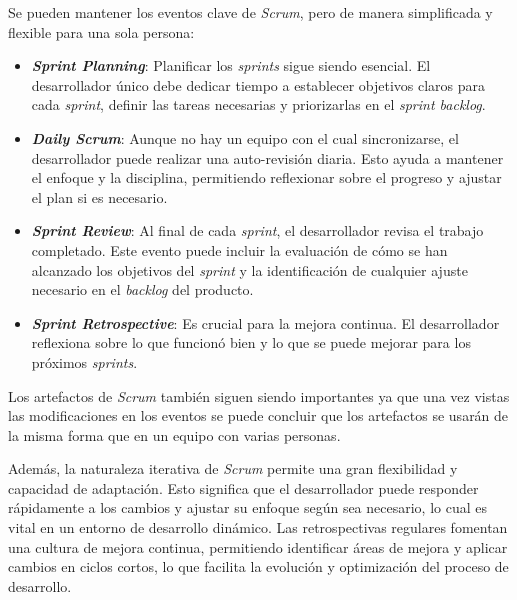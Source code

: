 Se pueden mantener los eventos clave de \textit{Scrum}, pero de manera simplificada y flexible para una sola persona:
\begin{itemize}
    
    \item\textbf{\textit{Sprint Planning}}: Planificar los \textit{sprints} sigue siendo esencial. El desarrollador único debe dedicar tiempo a establecer objetivos claros para cada \textit{sprint}, definir las tareas necesarias y priorizarlas en el \textit{sprint backlog}.
    
    \item\textbf{\textit{Daily Scrum}}: Aunque no hay un equipo con el cual sincronizarse, el desarrollador puede realizar una auto-revisión diaria. Esto ayuda a mantener el enfoque y la disciplina, permitiendo reflexionar sobre el progreso y ajustar el plan si es necesario.
    
    \item\textbf{\textit{Sprint Review}}: Al final de cada \textit{sprint}, el desarrollador revisa el trabajo completado. Este evento puede incluir la evaluación de cómo se han alcanzado los objetivos del \textit{sprint} y la identificación de cualquier ajuste necesario en el \textit{backlog} del producto.

    \item\textbf{\textit{Sprint Retrospective}}: Es crucial para la mejora continua. El desarrollador reflexiona sobre lo que funcionó bien y lo que se puede mejorar para los próximos \textit{sprints}.
  
\end{itemize}

Los artefactos de \textit{Scrum} también siguen siendo importantes ya que una vez
vistas las modificaciones en los eventos se puede concluir que los artefactos se usarán de la misma forma que en un equipo con varias personas. 

Además, la naturaleza iterativa de \textit{Scrum} permite una gran flexibilidad y
capacidad de adaptación. Esto significa que el desarrollador puede responder rápidamente a los cambios y ajustar su enfoque según sea necesario, lo cual es vital en un entorno de desarrollo dinámico. Las retrospectivas regulares fomentan una cultura de mejora continua, permitiendo identificar áreas de mejora y aplicar cambios en ciclos cortos, lo que facilita la evolución y optimización del proceso de desarrollo.

